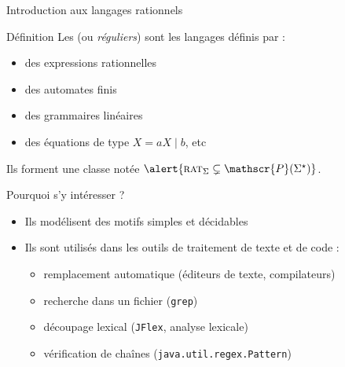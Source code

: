
\begingroup

\begin{frame}{Introduction aux langages rationnels}
  
  \begin{block}{Définition}
    Les  (ou \emph{réguliers}) sont les langages définis par :
    \begin{itemize}
      \item des expressions rationnelles
      \item des automates finis
      \item des grammaires linéaires
      \item des équations de type $X = aX \mid b$, etc
    \end{itemize}
    Ils forment une classe notée $\alert{\textsc{rat}_\Sigma \subsetneq \mathscr{P}(\Sigma^\star)}$.
  \end{block}

  \begin{block}{Pourquoi s’y intéresser ?}
    \begin{itemize}
      \item Ils modélisent des motifs simples et décidables
      \item Ils sont utilisés dans les outils de traitement de texte et de code :
        \begin{itemize}
          \item remplacement automatique (éditeurs de texte, compilateurs)
          \item recherche dans un fichier (\texttt{grep})
          \item découpage lexical (\texttt{JFlex}, analyse lexicale)
          \item vérification de chaînes (\texttt{java.util.regex.Pattern})
        \end{itemize}
    \end{itemize}
  \end{block}

\end{frame}

\endgroup
